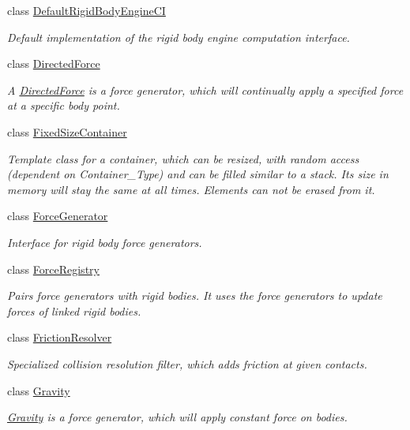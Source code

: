 \begin{DoxyCompactItemize}
class \mbox{\hyperlink{classr3_1_1_default_rigid_body_engine_c_i}{Default\+Rigid\+Body\+Engine\+CI}}
\begin{DoxyCompactList}\small\item\em Default implementation of the rigid body engine computation interface. \end{DoxyCompactList}\item 
class \mbox{\hyperlink{classr3_1_1_directed_force}{Directed\+Force}}
\begin{DoxyCompactList}\small\item\em A \mbox{\hyperlink{classr3_1_1_directed_force}{Directed\+Force}} is a force generator, which will continually apply a specified force at a specific body point. \end{DoxyCompactList}\item 
class \mbox{\hyperlink{classr3_1_1_fixed_size_container}{Fixed\+Size\+Container}}
\begin{DoxyCompactList}\small\item\em Template class for a container, which can be resized, with random access (dependent on Container\+\_\+\+Type) and can be filled similar to a stack. Its size in memory will stay the same at all times. Elements can not be erased from it. \end{DoxyCompactList}\item 
class \mbox{\hyperlink{classr3_1_1_force_generator}{Force\+Generator}}
\begin{DoxyCompactList}\small\item\em Interface for rigid body force generators. \end{DoxyCompactList}\item 
class \mbox{\hyperlink{classr3_1_1_force_registry}{Force\+Registry}}
\begin{DoxyCompactList}\small\item\em Pairs force generators with rigid bodies. It uses the force generators to update forces of linked rigid bodies. \end{DoxyCompactList}\item 
class \mbox{\hyperlink{classr3_1_1_friction_resolver}{Friction\+Resolver}}
\begin{DoxyCompactList}\small\item\em Specialized collision resolution filter, which adds friction at given contacts. \end{DoxyCompactList}\item 
class \mbox{\hyperlink{classr3_1_1_gravity}{Gravity}}
\begin{DoxyCompactList}\small\item\em \mbox{\hyperlink{classr3_1_1_gravity}{Gravity}} is a force generator, which will apply constant force on bodies. \end{DoxyCompactList}\item 

\end{DoxyCompactItemize}
